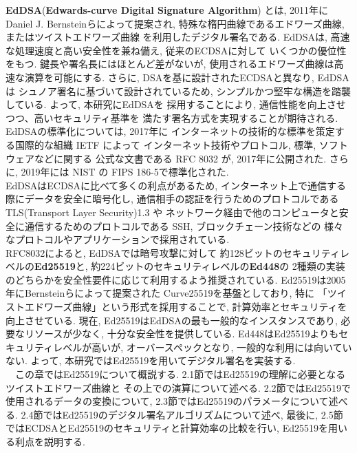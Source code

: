 \textbf{EdDSA}(\textbf{Edwards-curve Digital Signature Algorithm})
とは, 2011年にDaniel J. Bernsteinらによって提案され, 
特殊な楕円曲線であるエドワーズ曲線, またはツイストエドワーズ曲線
\cite{twisted}を利用したデジタル署名である\cite{high-speed}. 
EdDSAは, 高速な処理速度と高い安全性を兼ね備え, 従来のECDSAに対して
いくつかの優位性をもつ. 鍵長や署名長にはほとんど差がないが, 
使用されるエドワーズ曲線は高速な演算を可能にする. 
さらに, DSAを基に設計されたECDSAと異なり, EdDSAは
シュノア署名\cite{schnorr}に基づいて設計されているため, 
シンプルかつ堅牢な構造を踏襲している. よって, 本研究にEdDSAを
採用することにより, 通信性能を向上させつつ、高いセキュリティ基準を
満たす署名方式を実現することが期待される.\\
\indent EdDSAの標準化については, 2017年に
インターネットの技術的な標準を策定する国際的な組織 IETF によって
インターネット技術やプロトコル, 標準, ソフトウェアなどに関する
公式な文書である RFC 8032 \cite{8032}が, 2017年に公開された. 
さらに, 2019年には
NIST の FIPS 186-5で標準化された.\\
\indent EdDSAはECDSAに比べて多くの利点があるため, 
インターネット上で通信する際にデータを安全に暗号化し, 
通信相手の認証を行うためのプロトコルである 
TLS(Transport Layer Security)1.3 \cite{rfc8446}や
ネットワーク経由で他のコンピュータと安全に通信するためのプロトコルである 
SSH, ブロックチェーン技術などの
様々なプロトコルやアプリケーションで採用されている\cite{monero}.\\
\indent RFC8032によると, EdDSAでは暗号攻撃に対して
約128ビットのセキュリティレベルの\textbf{Ed25519}と, 
約224ビットのセキュリティレベルの\textbf{Ed448}の
2種類の実装のどちらかを安全性要件に応じて利用するよう推奨されている. 
Ed25519は2005年にBernsteinらによって提案された
Curve25519\cite{curve25519}を基盤としており, 特に
「ツイストエドワーズ曲線」という形式を採用することで, 
計算効率とセキュリティを向上させている. 
現在, Ed25519はEdDSAの最も一般的なインスタンスであり, 
必要なリソースが少なく, 十分な安全性を提供している. 
Ed448はEd25519よりもセキュリティレベルが高いが, 
オーバースペックとなり, 一般的な利用には向いていない. 
よって, 本研究ではEd25519を用いてデジタル署名を実装する.\\
　この章ではEd25519について概説する. 
2.1節ではEd25519の理解に必要となるツイストエドワーズ曲線と
その上での演算について述べる. 
2.2節ではEd25519で使用されるデータの変換について, 
2.3節ではEd25519のパラメータについて述べる. 
2.4節ではEd25519のデジタル署名アルゴリズムについて述べ, 
最後に, 2.5節ではECDSAとEd25519のセキュリティと計算効率の比較を行い, 
Ed25519を用いる利点を説明する.\\
